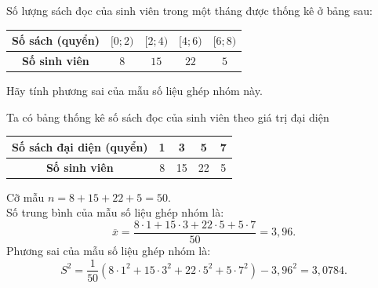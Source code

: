 \begin{bt}[Mức độ 2]%
Số lượng sách đọc của sinh viên trong một tháng được thống kê ở bảng sau:
\begin{center}
\begin{tabular}{|c|c|c|c|c|}
\hline
\textbf{Số sách (quyển)} & $[0; 2)$ & $[2; 4)$ & $[4; 6)$ & $[6; 8)$ \\
\hline
\textbf{Số sinh viên} & $8$ & $15$ & $22$ & $5$ \\
\hline
\end{tabular}
\end{center}
Hãy tính phương sai của mẫu số liệu ghép nhóm này.
\loigiai
{
Ta có bảng thống kê số sách đọc của sinh viên theo giá trị đại diện
\begin{center}
\begin{tabular}{|c|c|c|c|c|}
\hline
\textbf{Số sách đại diện (quyển)} & 1 & 3 & 5 & 7 \\
\hline
\textbf{Số sinh viên} & 8 & 15 & 22 & 5 \\
\hline
\end{tabular}
\end{center}
Cỡ mẫu $n=8+15+22+5=50$.\\
Số trung bình của mẫu số liệu ghép nhóm là:
\[ \overline{x}=\dfrac{8\cdot 1+15\cdot 3+22\cdot 5+5\cdot 7}{50}=3{,}96. \]
Phương sai của mẫu số liệu ghép nhóm là:
\[ S^2=\dfrac{1}{50}\left(8\cdot 1^2+15\cdot 3^2+22\cdot 5^2+5\cdot 7^2 \right)-3{,}96^2= 3{,}0784. \]
}
\end{bt}

